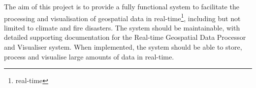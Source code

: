 The aim of this project is to provide a fully functional system to facilitate the processing and visualisation of geospatial data in real-time\footnote[1]{real-time}, including but not limited to climate and fire disasters. The system should be maintainable, with detailed supporting documentation for the Real-time Geospatial Data Processor and Visualiser system. When implemented, the system should be able to store, process and visualise large amounts of data in real-time.